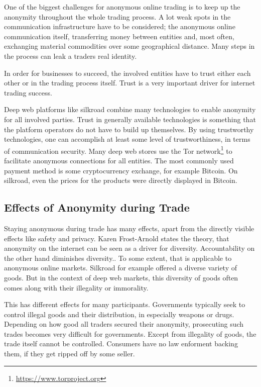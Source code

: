 One of the biggest challenges for anonymous online trading is to keep up the anonymity throughout the whole trading process. A lot weak spots in the communication infrastructure have to be considered; the anonymous online communication itself, transferring money between entities and, most often, exchanging material commodities over some geographical distance. Many steps in the process can leak a traders real identity.

In order for businesses to succeed, the involved entities have to trust either each other or in the trading process itself. Trust is a very important driver for internet trading success\cite{internetTrust2004}.

Deep web platforms like silkroad\cite{silkroad2013} combine many technologies to enable anonymity for all involved parties. Trust in generally available technologies is something that the platform operators do not have to build up themselves. By using trustworthy technologies, one can accomplish at least some level of trustworthiness, in terms of communication security. Many deep web stores use the Tor network\footnote{\url{https://www.torproject.org}} to facilitate anonymous connections for all entities\cite{silkroad2013}. The most commonly used payment method is some cryptocurrency exchange, for example Bitcoin. On silkroad, even the prices for the products were directly displayed in Bitcoin\cite{silkroad2013}.

\subsection{Effects of Anonymity during Trade}

Staying anonymous during trade has many effects, apart from the directly visible effects like safety and privacy. Karen Frost-Arnold states the theory, that anonymity on the internet can be seen as a driver for diversity. Accountability on the other hand diminishes diversity.\cite{accountability2014}. To some extent, that is applicable to anonymous online markets. Silkroad for example offered a diverse variety of goods. But in the context of deep web markets, this diversity of goods often comes along with their illegality or immorality\cite{silkroad2013}.

This has different effects for many participants. Governments typically seek to control illegal goods and their distribution, in especially weapons or drugs. Depending on how good all traders secured their anonymity, prosecuting such trades becomes very difficult for governments. Except from illegality of goods, the trade itself cannot be controlled. Consumers have no law enforment backing them, if they get ripped off by some seller.

